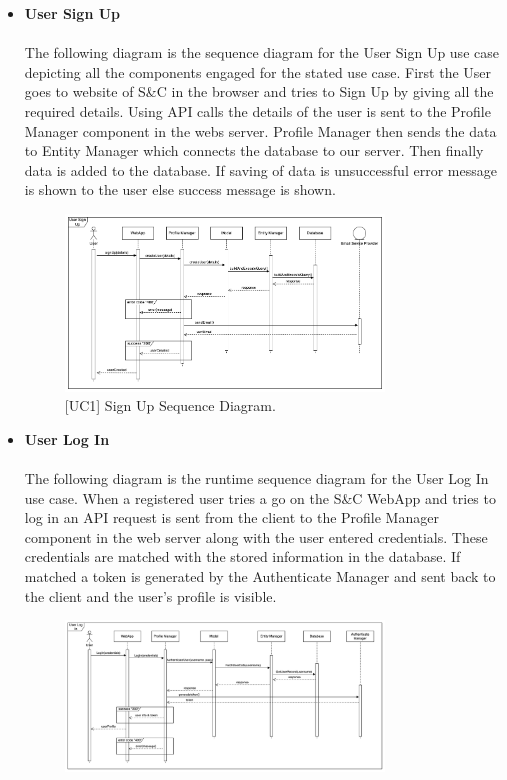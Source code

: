 \begin{itemize}
    \item \textbf{User Sign Up} \\ \\
    The following diagram is the sequence diagram for the User Sign Up use case depicting all the components engaged for the stated use case. First the User goes to website of S\&C in the browser and tries to Sign Up by giving all the required details. Using API calls the details of the user is sent to the Profile Manager component in the webs server. Profile Manager then sends the data to Entity Manager which connects the database to our server. Then finally data is added to the database. If saving of data is unsuccessful error message is shown to the user else success message is shown.
    \begin{figure}[H]
    \centering
    \includegraphics[width=0.8\textwidth]{Images/Sign_Up_Sequence_Diagram.png}
    \caption{\label{fig:metamodel9}[UC1] Sign Up Sequence Diagram.}
    \end{figure}
    \clearpage
    \item \textbf{User Log In} \\ \\
    The following diagram is the runtime sequence diagram for the User Log In use case. When a registered user tries a go on the S\&C WebApp and tries to log in an API request is sent from the client to the Profile Manager component in the web server along with the user entered credentials. These credentials are matched with the stored information in the database. If matched a token is generated by the Authenticate Manager and sent back to the client and the user's profile is visible.
    \begin{figure}[H]
    \centering
    \includegraphics[width=0.8\textwidth]{Images/Log_In_Sequence_Diagram.png}

\end{figure}
\end{itemize}
